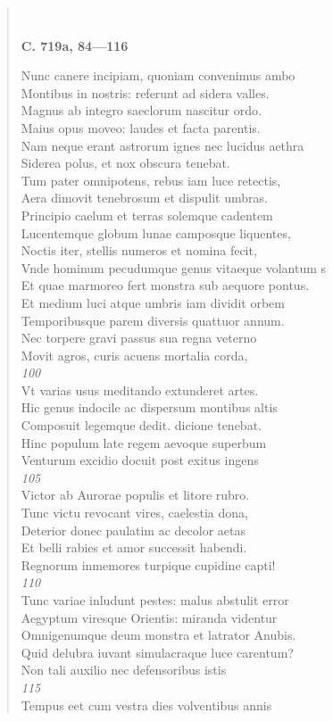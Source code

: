 \documentclass[11pt, a4paper]{report}
\begin{document}
\begin{verse}
        ﻿\pagebreak 
     \marginpar{[192]} \begin{center} \textbf{C. 719a, 84—116} \end{center}Nunc canere incipiam, quoniam convenimus ambo \\ Montibus in nostris: referunt ad sidera valles. \\ Magnus ab integro saeclorum nascitur ordo. \\ Maius opus moveo: laudes et facta parentis. \\ Nam neque erant astrorum ignes nec lucidus aethra \\ Siderea polus, et nox obscura tenebat. \\ Tum pater omnipotens, rebus iam luce retectis, \\ Aera dimovit tenebrosum et dispulit umbras. \\ Principio caelum et terras solemque cadentem \\ Lucentemque globum lunae camposque liquentes, \\ Noctis iter, stellis numeros et nomina fecit, \\ Vnde hominum pecudumque genus vitaeque volantum s \\ Et quae marmoreo fert monstra sub aequore pontus. \\ Et medium luci atque umbris iam dividit orbem \\ Temporibusque parem diversis quattuor annum. \\ Nec torpere gravi passus sua regna veterno \\ Movit agros, curis acuens mortalia corda, \\ \textit{100} \\ Vt varias usus meditando extunderet artes. \\ Hic genus indocile ac dispersum montibus altis \\ Composuit legemque dedit. dicione tenebat. \\ Hinc populum late regem aevoque superbum \\ Venturum excidio docuit post exitus ingens \\ \textit{105} \\ Victor ab Aurorae populis et litore rubro. \\ Tunc victu revocant vires, caelestia dona, \\ Deterior donec paulatim ac decolor aetas \\ Et belli rabies et amor successit habendi. \\ Regnorum inmemores turpique cupidine capti! \\ \textit{110} \\ Tunc variae inludunt pestes: malus abstulit error \\ Aegyptum viresque Orientis: miranda videntur \\ Omnigenumque deum monstra et latrator Anubis. \\ Quid delubra iuvant simulacraque luce carentum? \\ Non tali auxilio nec defensoribus istis \\ \textit{115} \\ Tempus eet cum vestra dies volventibus annis \\ 

\end{verse}
\end{document}

